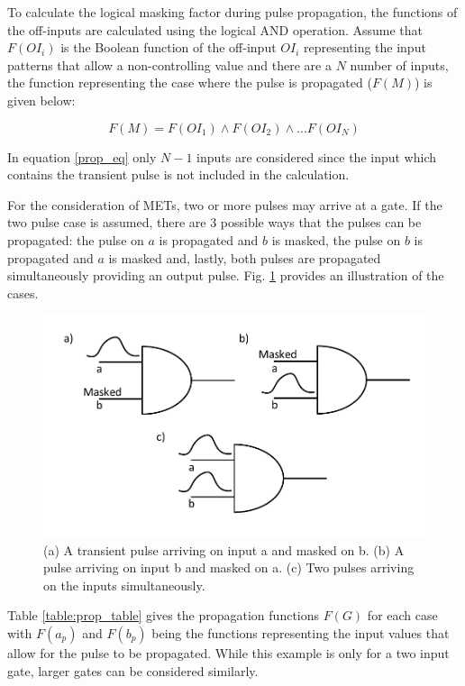 To calculate the logical masking factor during pulse propagation, the functions of the off-inputs are calculated using the logical AND operation. Assume that $F(OI_i)$ is the Boolean function of the off-input $OI_i$ representing the input patterns that allow a non-controlling value and there are a $N$ number of inputs, the function representing the case where the pulse is propagated ($F(M)$) is given below:

\begin{equation} \label{prop_eq}
F(M) = F(OI_1) \land F(OI_2) \land ... F(OI_N)
\end{equation}

In equation \ref{prop_eq} only $N-1$ inputs are considered since the input which contains the transient pulse is not included in the calculation. 

For the consideration of METs, two or more pulses may arrive at a gate. If the two pulse case is assumed, there are 3 possible ways that the pulses can be propagated: the pulse on $a$ is propagated and $b$ is masked, the pulse on $b$ is propagated and $a$ is masked and, lastly, both pulses are propagated simultaneously providing an output pulse. Fig. \ref{Prop_MET} provides an illustration of the cases.

\begin{figure}[!htbp]
	\centering
	\includegraphics[width=0.80\linewidth]{Figures/Prop_MET}
	\caption{(a) A transient pulse arriving on input a and masked on b. (b) A pulse arriving on input b and masked on a. (c) Two pulses arriving on the inputs simultaneously.}
	\label{Prop_MET}
\end{figure}

Table \ref{table:prop_table} gives the propagation functions $F(G)$ for each case with $F(a_p)$ and $F(b_p)$ being the functions representing the input values that allow for the pulse to be propagated. While this example is only for a two input gate, larger gates can be considered similarly.

